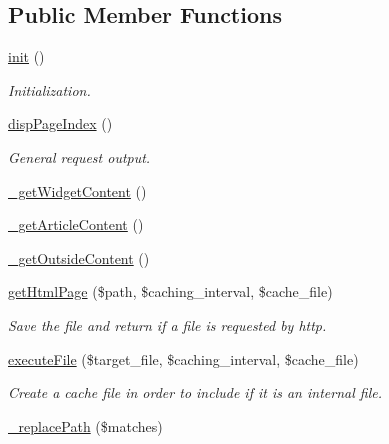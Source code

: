 \subsection*{Public Member Functions}
\begin{DoxyCompactItemize}
\item 
\hyperlink{classpageView_a203a3f77c9ece543e00517e647f1e07b}{init} ()
\begin{DoxyCompactList}\small\item\em Initialization. \end{DoxyCompactList}\item 
\hyperlink{classpageView_a9e3cf0b29ff11a4bbb1ec1ccfacd4236}{disp\+Page\+Index} ()
\begin{DoxyCompactList}\small\item\em General request output. \end{DoxyCompactList}\item 
\hyperlink{classpageView_a5f10c6cf83c7e65e3359423211ead3d8}{\+\_\+get\+Widget\+Content} ()
\item 
\hyperlink{classpageView_a8f6d1347a1991eec2ae2b964f5fec274}{\+\_\+get\+Article\+Content} ()
\item 
\hyperlink{classpageView_aa8045c86496ebdaa32c18e648be079f3}{\+\_\+get\+Outside\+Content} ()
\item 
\hyperlink{classpageView_af3d32b790b5703c5eb384060b24d619e}{get\+Html\+Page} (\$path, \$caching\+\_\+interval, \$cache\+\_\+file)
\begin{DoxyCompactList}\small\item\em Save the file and return if a file is requested by http. \end{DoxyCompactList}\item 
\hyperlink{classpageView_a198777f4c0155f8ad2a0c2826221395e}{execute\+File} (\$target\+\_\+file, \$caching\+\_\+interval, \$cache\+\_\+file)
\begin{DoxyCompactList}\small\item\em Create a cache file in order to include if it is an internal file. \end{DoxyCompactList}\item 
\hyperlink{classpageView_a271e9a47148d838689894366475cefd2}{\+\_\+replace\+Path} (\$matches)
\end{DoxyCompactItemize}
